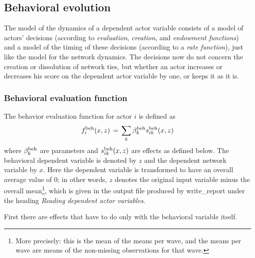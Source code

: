 \documentclass[a4paper,fleqn,11pt]{article}
\newcommand{\+}{\, + \,}
\newcommand{\sfn}[1]{\textsf{#1}}
\begin{document}
\subsection{Behavioral evolution}
\label{S_ff_b}

The model of the dynamics of a dependent actor variable
consists of a model of actors' decisions (according to {\it
evaluation}, {\it creation}, and {\it endowment functions})
and a model of the timing
of these decisions (according to a {\it rate function}),
just like the model for the network dynamics. The
decisions now do not concern the creation or dissolution of
network ties, but whether an actor increases or decreases his
score on the dependent actor variable by one, or keeps it as it
is.

\subsubsection{Behavioral evaluation function}
\label{S_f_b}

The behavior evaluation function for actor $i$ is defined as
\begin{equation}
f^{\rm beh}_i(x, z) \, = \, \sum_k \beta^{\rm beh}_k s^{\rm beh}_{ik}(x, z)
                                             \label{f_beh}
\end{equation}
where $\beta^{\rm beh}_k$ are parameters and $s^{\rm beh}_{ik}(x, z)$
are effects as defined below.
The behavioral dependent variable is denoted by $z$ and the
dependent network variable by $x$.
Here the dependent variable is transformed
to have an overall average value of 0;
in other words, $z$ denotes the original input variable
minus the overall mean\footnote{More precisely: \label{meandef}
this is the mean of the means per wave, and the
means per wave are means of the non-missing observations
for that wave.}, which is given in the
output file produced by \sfn{write\_report} under the heading
\emph{Reading dependent actor variables}.

First there are effects that have to do only
with the behavioral variable itself.
\end{document}
